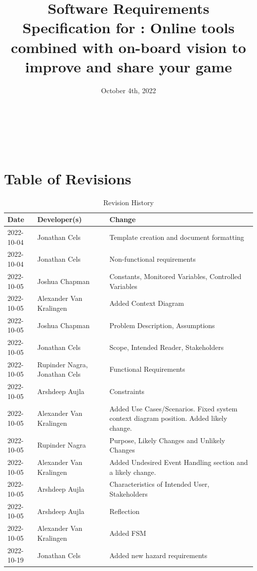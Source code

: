 \documentclass[12pt]{article}
\begin{document}
\title{Software Requirements Specification for \progname{}: Online tools combined with on-board vision to improve and share your game} 
\author{\authname}
\date{October 4th, 2022}
	
\maketitle

~\newpage

\tableofcontents

~\newpage

\section*{Table of Revisions}
\begin{table}[hp]
\caption{Revision History} \label{TblRevisionHistory}
\begin{tabularx}{\textwidth}{llX}
\toprule
\textbf{Date} & \textbf{Developer(s)} & \textbf{Change}\\
\midrule
2022-10-04 & Jonathan Cels & Template creation and document formatting\\ 
2022-10-04 & Jonathan Cels & Non-functional requirements\\
2022-10-05 & Joshua Chapman & Constants, Monitored Variables, Controlled Variables\\
2022-10-05 & Alexander Van Kralingen & Added Context Diagram\\
2022-10-05 & Joshua Chapman & Problem Description, Assumptions \\
2022-10-05 & Jonathan Cels & Scope, Intended Reader, Stakeholders\\
2022-10-05 & Rupinder Nagra, Jonathan Cels & Functional Requirements\\
2022-10-05 & Arshdeep Aujla & Constraints\\
2022-10-05 & Alexander Van Kralingen & Added Use Cases/Scenarios. Fixed system context diagram position. Added likely change.\\
2022-10-05 & Rupinder Nagra & Purpose, Likely Changes and Unlikely Changes\\
2022-10-05 & Alexander Van Kralingen & Added Undesired Event Handling section and a likely change.\\
2022-10-05 & Arshdeep Aujla & Characteristics of Intended User, Stakeholders\\
2022-10-05 & Arshdeep Aujla & Reflection\\
2022-10-05 & Alexander Van Kralingen & Added FSM\\
2022-10-19 & Jonathan Cels & Added new hazard requirements\\
\bottomrule
\end{tabularx}
\end{table}
\end{document}
